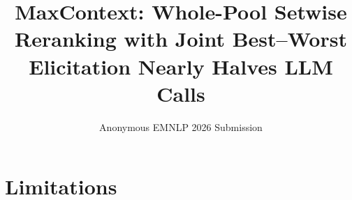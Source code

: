 \documentclass[11pt]{article}
\title{MaxContext: Whole-Pool Setwise Reranking with Joint Best--Worst Elicitation Nearly Halves LLM Calls}
\author{Anonymous EMNLP 2026 Submission}
\begin{document}
\maketitle

\begin{abstract}

\end{abstract}









\section*{Limitations}




\appendix

\end{document}
